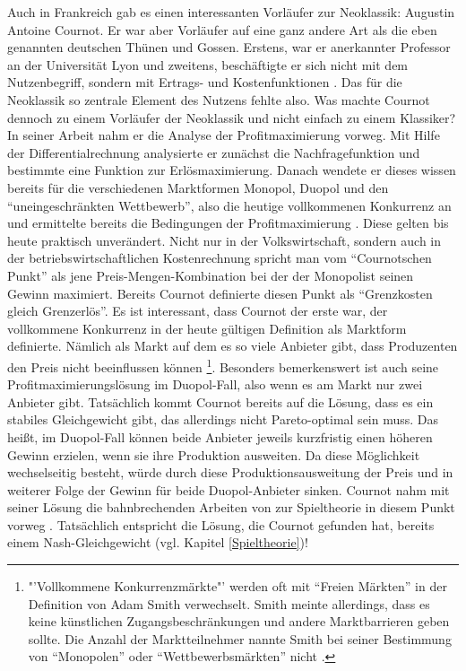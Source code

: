 Auch in Frankreich gab es einen interessanten Vorläufer zur Neoklassik: Augustin Antoine Cournot. Er war aber Vorläufer auf eine ganz andere Art als die eben genannten deutschen Thünen und Gossen. Erstens, war er anerkannter Professor an der Universität Lyon und zweitens, beschäftigte er sich nicht mit dem Nutzenbegriff, sondern mit Ertrags- und Kostenfunktionen \parencite[S. 287f]{Rosner2012}. Das für die Neoklassik so zentrale Element des Nutzens fehlte also. Was machte Cournot dennoch zu einem Vorläufer der Neoklassik und nicht einfach zu einem Klassiker? In seiner Arbeit \textcite{Cournot1838} nahm er die Analyse der Profitmaximierung vorweg. Mit Hilfe der Differentialrechnung analysierte er zunächst die Nachfragefunktion und bestimmte eine Funktion zur Erlösmaximierung. Danach wendete er dieses wissen bereits für die verschiedenen Marktformen Monopol, Duopol und den "`uneingeschränkten Wettbewerb"', also die heutige vollkommenen Konkurrenz an und ermittelte bereits die Bedingungen der Profitmaximierung \parencite[S. 289]{Rosner2012}. Diese gelten bis heute praktisch unverändert.  Nicht nur in der Volkswirtschaft, sondern auch in der betriebswirtschaftlichen Kostenrechnung spricht man vom "`Cournotschen Punkt"' als jene Preis-Mengen-Kombination bei der der Monopolist seinen Gewinn maximiert. Bereits Cournot definierte diesen Punkt als "`Grenzkosten gleich Grenzerlös"'. Es ist interessant, dass Cournot der erste war, der vollkommene Konkurrenz in der heute gültigen Definition als Marktform definierte. Nämlich als Markt auf dem es so viele Anbieter gibt, dass Produzenten den Preis nicht beeinflussen können \footnote{"'Vollkommene Konkurrenzmärkte"' werden oft mit "`Freien Märkten"' in der Definition von Adam Smith verwechselt. Smith meinte allerdings, dass es keine künstlichen Zugangsbeschränkungen und andere Marktbarrieren geben sollte. Die Anzahl der Marktteilnehmer nannte Smith bei seiner Bestimmung von "`Monopolen"' oder "`Wettbewerbsmärkten"' nicht \parencite{Blaug2001}.}. Besonders bemerkenswert ist auch seine Profitmaximierungslösung im Duopol-Fall, also wenn es am Markt nur zwei Anbieter gibt. Tatsächlich kommt Cournot bereits auf die Lösung, dass es ein stabiles Gleichgewicht gibt, das allerdings nicht Pareto-optimal sein muss. Das heißt, im Duopol-Fall können beide Anbieter jeweils kurzfristig einen höheren Gewinn erzielen, wenn sie ihre Produktion ausweiten. Da diese Möglichkeit wechselseitig besteht, würde durch diese Produktionsausweitung der Preis und in weiterer Folge der Gewinn für beide Duopol-Anbieter sinken. Cournot nahm mit seiner Lösung die bahnbrechenden Arbeiten von \textcite{Nash1950} zur Spieltheorie in diesem Punkt vorweg \parencite{Leonard1994}. Tatsächlich entspricht die Lösung, die Cournot gefunden hat, bereits einem Nash-Gleichgewicht (vgl. Kapitel \ref{Spieltheorie})!


